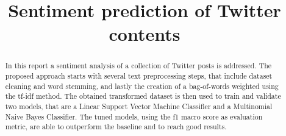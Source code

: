 \documentclass[conference]{IEEEtran}
\begin{document}
\title{Sentiment prediction of Twitter contents}

\author{
}

\maketitle

\begin{abstract}
In this report a sentiment analysis of a collection of Twitter posts is addressed. The proposed approach starts with several text preprocessing steps, that include dataset cleaning and word stemming, and lastly the creation of a bag-of-words weighted using the tf-idf method. The obtained transformed dataset is then used to train and validate two models, that are a Linear Support Vector Machine Classifier and a Multinomial Naive Bayes Classifier. The tuned models, using the f1 macro score as evaluation metric, are able to outperform the baseline and to reach good results. 
\end{abstract}
\end{document}
